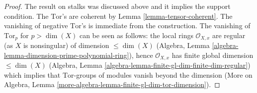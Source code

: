 \documentclass[10pt,a4paper]{amsart}
\theoremstyle{plain}
\theoremstyle{definition}
\theoremstyle{remark}
\numberwithin{equation}{subsection}
\begin{document}
\begin{proof}
The result on stalks was discussed above and it implies the support
condition. The $\text{Tor}$'s are coherent by
Lemma \ref{lemma-tensor-coherent}. The vanishing of negative
$\text{Tor}$'s is immediate from the construction. The
vanishing of $\text{Tor}_p$ for $p > \dim(X)$ can be seen as follows:
the local rings $\mathcal{O}_{X, x}$ are regular
(as $X$ is nonsingular) of dimension $\leq \dim(X)$
(Algebra, Lemma \ref{algebra-lemma-dimension-prime-polynomial-ring}),
hence $\mathcal{O}_{X, x}$ has finite global dimension $\leq \dim(X)$
(Algebra, Lemma \ref{algebra-lemma-finite-gl-dim-finite-dim-regular})
which implies that $\text{Tor}$-groups of modules vanish beyond the dimension
(More on Algebra, Lemma \ref{more-algebra-lemma-finite-gl-dim-tor-dimension}).
\end{proof}
\end{document}
